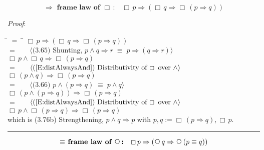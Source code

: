 \documentclass[12pt, fleqn, leqno]{article}
\newcommand{\lgap}{2pt}                             %
\newcommand{\mymathindent}{24pt}                    %
\newcommand{\equivs}{\ensuremath{\;\equiv\;}}       %
\newcommand{\impl}{\ensuremath{\Rightarrow}}        %
\newcommand{\Next}{\;\,\text{\raisebox{3.5pt}{\circle{6}}}}
\newcommand{\Always}{\Box\,}
\newcommand{\myqed}{\rule[-.23ex]{1.2ex}{2.0ex}}
\newcommand{\myqedtab}{\hspace{384pt}}              %
\newcommand{\Gll} {\langle}                         %
\newcommand{\Ggg} {\rangle}                         %
\newcommand{\Hint}[1]     {\ \ \ $\Gll              \mbox{#1} \Ggg$ }   %
\begin{document}
\begin{equation}\label{E:implframelawAlways}
\textbf{$\impl$ frame law of $\Always$:}\quad \Always p \impl (\Always q \impl \Always (p \impl q))
\end{equation}

\emph{Proof}: 
\begin{tabbing}
\hspace{\mymathindent} \= $= \;$ \= \myqedtab \= \kill
  \> \>   $\Always p \impl (\Always q \impl \Always (p \impl q))$\\[\lgap]
  \> $=$  \>  \Hint{(3.65) Shunting, $p\land q\impl r\equivs p\impl (q\impl r)$}\\[\lgap]
  \> \>   $\Always p \land \Always q \impl \Always (p \impl q)$\\[\lgap]
  \> $=$  \>  \Hint{(\ref{E:distAlwaysAnd}) Distributivity of $\Always$ over $\land$}\\[\lgap]
  \> \>   $\Always (p \land q) \impl \Always (p \impl q)$\\[\lgap]
  \> $=$  \>  \Hint{(3.66) $p\land (p\impl q) \equivs p\land q$}\\[\lgap]
  \> \>   $\Always (p \land (p \impl q)) \impl \Always (p \impl q)$\\[\lgap]
  \> $=$  \>  \Hint{(\ref{E:distAlwaysAnd}) Distributivity of $\Always$ over $\land$}\\[\lgap]
  \> \>   $\Always p \land \Always (p \impl q) \impl \Always (p \impl q)$\\[\lgap]
   \> which is (3.76b) Strengthening, $p\land q \impl p$ with $p, q :=\Always (p \impl q) ,\Always p$. \quad \myqed
\end{tabbing}

\begin{equation}\label{E:equivframelawnext}
\textbf{$\equiv$ frame law of $\Next$:}\quad \Always p \impl (\Next q \impl \Next (p \equiv q))
\end{equation}
\end{document}

